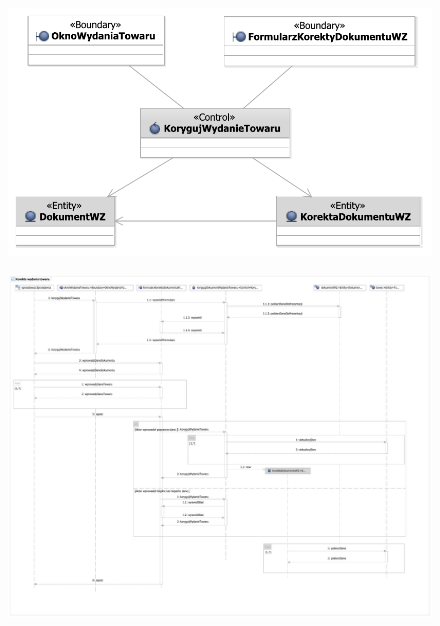 \begin{figure}[H]
  \centering
  \includegraphics[angle=\ecbangle, scale=\ecbscale]{../img/usecase/pu17ecb.pdf}
  \caption{}
\end{figure}
\newpage
\begin{figure}[H]
  \centering
  \includegraphics[angle=\seqangle, scale=0.32]{../img/usecase/pu17seq.pdf}
  \caption{}
\end{figure}
\newpage





